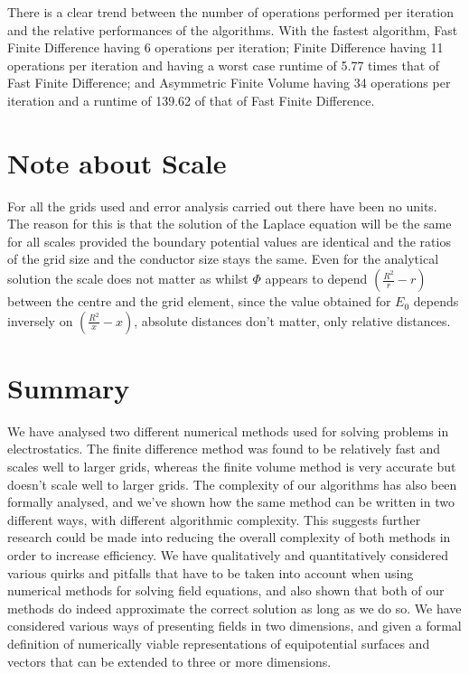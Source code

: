 \documentclass[aps,twocolumn,pre,nofootinbib,10pt]{revtex4-1}
\begin{document}
There is a clear trend between the number of operations performed per iteration and the relative performances of the algorithms. With the fastest algorithm, Fast Finite Difference having 6 operations per iteration; Finite Difference having 11 operations per iteration and having a worst case runtime of 5.77 times that of Fast Finite Difference; and Asymmetric Finite Volume having 34 operations per iteration and a runtime of 139.62 of that of Fast Finite Difference.

\section{Note about Scale}
For all the grids used and error analysis carried out there have been no units. The reason for this is that the solution of the Laplace equation will be the same for all scales provided the boundary potential values are identical and the ratios of the grid size and the conductor size stays the same. Even for the analytical solution the scale does not matter as whilst \(\Phi\) appears to depend \((\frac{R^2}{r}-r)\) between the centre and the grid element, since the value obtained for \(E_0\) depends inversely on \((\frac{R^2}{x}-x)\), absolute distances don't matter, only relative distances. 



\section{Summary \label{sec:sum}}
We have analysed two different numerical methods used for solving problems in electrostatics. The finite difference method was found to be relatively fast and scales well to larger grids, whereas the finite volume method is very accurate but doesn't scale well to larger grids. The complexity of our algorithms has also been formally analysed, and we've shown how the same method can be written in two different ways, with different algorithmic complexity. This suggests further research could be made into reducing the overall complexity of both methods in order to increase efficiency. We have qualitatively and quantitatively considered various quirks and pitfalls that have to be taken into account when using numerical methods for solving field equations, and also shown that both of our methods do indeed approximate the correct solution as long as we do so. We have considered various ways of presenting fields in two dimensions, and given a formal definition of numerically viable representations of equipotential 
surfaces and vectors that can be extended to three or more dimensions.
\end{document}
